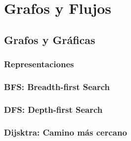 \documentclass[12pt, fleqn]{report}                             %
\theoremstyle{break}                                            %
\begin{document}
\part{Grafos y Flujos}

    \chapter{Grafos y Gráficas}    

        \section{Representaciones}

        \section{BFS: Breadth-first Search}


        \section{DFS: Depth-first Search}

        \section{Dijsktra: Camino más cercano}

        \clearpage
\end{document}
